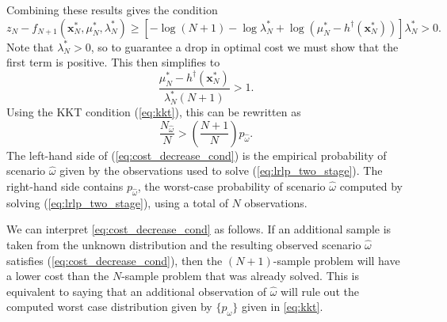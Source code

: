 \documentclass{iserc}
\newcommand{\x}{\mathbf{x}}
\begin{document}
Combining these results gives the condition
\[
	z_N - f_{N+1}(\x^*_N,\mu^*_N,\lambda^*_N) \geq \left[ -\log(N+1) - \log\lambda^*_N + \log(\mu^*_N-h^\dagger(\x^*_N))\right]\lambda^*_N > 0.
\]
Note that $\lambda^*_N > 0$, so to guarantee a drop in optimal cost we must show that the first term is positive.
This then simplifies to
\[
	\frac{\mu^*_N - h^\dagger(\x^*_N)}{\lambda^*_N(N+1)} > 1.
\]
Using the KKT condition (\ref{eq:kkt}), this can be rewritten as
\begin{equation} \label{eq:cost_decrease_cond}
	\frac{N_{\hat{\omega}}}{N} > \left( \frac{N+1}{N} \right) p_{\hat{\omega}}.
\end{equation}
The left-hand side of (\ref{eq:cost_decrease_cond}) is the empirical probability of scenario $\hat{\omega}$ given by the observations used to solve (\ref{eq:lrlp_two_stage}).
The right-hand side contains $p_{\hat{\omega}}$, the worst-case probability of scenario $\hat{\omega}$ computed by solving (\ref{eq:lrlp_two_stage}), using a total of $N$ observations.

We can interpret \eqref{eq:cost_decrease_cond} as follows. If an additional sample is taken from the unknown distribution and the resulting observed scenario $\hat{\omega}$ satisfies (\ref{eq:cost_decrease_cond}), then the $(N+1)$-sample problem will have a lower cost than the $N$-sample problem that was already solved.
This is equivalent to saying that an additional observation of $\hat{\omega}$ will rule out the computed worst case distribution given by $\{p_\omega\}$ given in \eqref{eq:kkt}.
\end{document}
